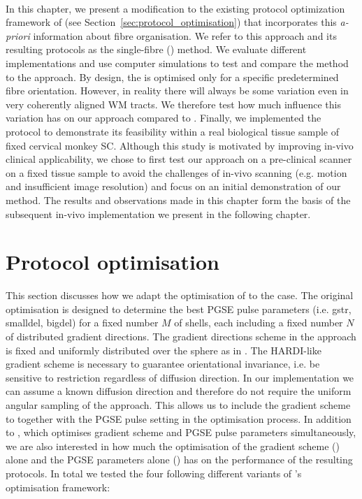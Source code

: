 \paragraph{}
In this chapter, we present a modification to the existing protocol optimization framework of \cite{Alexander:2008} (see Section~\ref{sec:protocol_optimisation}) that incorporates this \textit{a-priori} information about fibre organisation. We refer to this approach and its resulting protocols as the single-fibre ({\SF}) method. We evaluate different {\SF} implementations and use computer simulations to test and compare the \SF method to the {\OI} approach. By design, the {\SF} is optimised only for a specific predetermined fibre orientation. However, in reality there will always be some variation even in very coherently aligned \gls{WM} tracts. We therefore test how much influence this variation has on our {\SF} approach compared to {\OI}. Finally, we implemented the {\SF} protocol to demonstrate its feasibility within a real biological tissue sample of fixed cervical monkey \gls{SC}. Although this study is motivated by improving in-vivo clinical applicability, we chose to first test our approach on a pre-clinical scanner on a fixed tissue sample to avoid the challenges of in-vivo scanning (e.g. motion and insufficient image resolution) and focus on an initial demonstration of our method. The results and observations made in this chapter form the basis of the subsequent in-vivo implementation we present in the following chapter.

\section{Protocol optimisation}
This section discusses how we adapt the {\OI} optimisation of \citet{Alexander:2008} to the {\SF} case. The original {\OI} optimisation is designed to determine the best PGSE pulse parameters (i.e. \gls{gstr}, \gls{smalldel}, \gls{bigdel}) for a fixed number $M$ of shells, each including a fixed number $N$ of distributed gradient directions. The gradient directions scheme in the \OI{} approach is fixed and uniformly distributed over the sphere as in \citep{Cook:2007}. The HARDI-like gradient scheme is necessary to guarantee orientational invariance, i.e. be sensitive to restriction regardless of diffusion direction. In our {\SF} implementation we can assume a known diffusion direction and therefore do not require the uniform angular sampling of the {\OI} approach. This allows us to include the gradient scheme to together with the PGSE pulse setting in the optimisation process. In addition to {\SF}, which optimises gradient scheme and PGSE pulse parameters simultaneously, we are also interested in how much the optimisation of the gradient scheme ({\DO}) alone and the PGSE parameters alone ({\SD}) has on the performance of the resulting protocols. In total we tested the four following different variants of \citet{Alexander:2008}'s optimisation framework:

